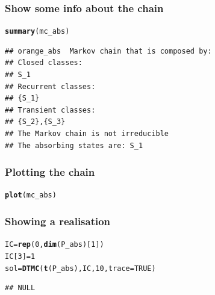 \documentclass[aspectratio=169]{beamer}\usepackage[]{graphicx}\usepackage[]{xcolor}
\makeatletter
\newcommand{\hlnum}[1]{\textcolor[rgb]{0.686,0.059,0.569}{#1}}%
\newcommand{\hldef}[1]{\textcolor[rgb]{0.345,0.345,0.345}{#1}}%
\newcommand{\hlkwb}[1]{\textcolor[rgb]{0.69,0.353,0.396}{#1}}%
\newcommand{\hlkwc}[1]{\textcolor[rgb]{0.333,0.667,0.333}{#1}}%
\newcommand{\hlkwd}[1]{\textcolor[rgb]{0.737,0.353,0.396}{\textbf{#1}}}%
\newenvironment{kframe}{%
 \def\at@end@of@kframe{}%
 \ifinner\ifhmode%
  \def\at@end@of@kframe{\end{minipage}}%
  \begin{minipage}{\columnwidth}%
 \fi\fi%
 \def\FrameCommand##1{\hskip\@totalleftmargin \hskip-\fboxsep
 \colorbox{shadecolor}{##1}\hskip-\fboxsep
     \hskip-\linewidth \hskip-\@totalleftmargin \hskip\columnwidth}%
 \MakeFramed {\advance\hsize-\width
   \@totalleftmargin\z@ \linewidth\hsize
   \@setminipage}}%
 {\par\unskip\endMakeFramed%
 \at@end@of@kframe}
\newenvironment{knitrout}{}{} %
\makeatother
\begin{document}
\begin{frame}[fragile]\frametitle{Show some info about the chain}
\begin{knitrout}
\color{fgcolor}\begin{kframe}
\begin{alltt}
\hlkwd{summary}\hldef{(mc_abs)}
\end{alltt}
\begin{verbatim}
## orange_abs  Markov chain that is composed by: 
## Closed classes: 
## S_1 
## Recurrent classes: 
## {S_1}
## Transient classes: 
## {S_2},{S_3}
## The Markov chain is not irreducible 
## The absorbing states are: S_1
\end{verbatim}
\end{kframe}
\end{knitrout}
\end{frame}
  
\begin{frame}[fragile]\frametitle{Plotting the chain}
\begin{knitrout}
\color{fgcolor}\begin{kframe}
\begin{alltt}
\hlkwd{plot}\hldef{(mc_abs)}
\end{alltt}
\end{kframe}
\end{knitrout}
\end{frame}
  
  
\begin{frame}[fragile]\frametitle{Showing a realisation}
\begin{knitrout}
\color{fgcolor}\begin{kframe}
\begin{alltt}
\hldef{IC} \hlkwb{=} \hlkwd{rep}\hldef{(}\hlnum{0}\hldef{,} \hlkwd{dim}\hldef{(P_abs)[}\hlnum{1}\hldef{])}
\hldef{IC[}\hlnum{3}\hldef{]} \hlkwb{=} \hlnum{1}
\hldef{sol} \hlkwb{=} \hlkwd{DTMC}\hldef{(}\hlkwd{t}\hldef{(P_abs), IC,} \hlnum{10}\hldef{,} \hlkwc{trace}\hldef{=}\hlnum{TRUE}\hldef{)}
\end{alltt}
\begin{verbatim}
## NULL
\end{verbatim}
\end{kframe}
\end{knitrout}
\end{frame}
\end{document}
